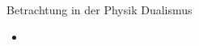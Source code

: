 \begin{frame}{Betrachtung in der Physik}
	Dualismus
	\begin{itemize}
		\item{}
	\end{itemize}
\end{frame}
